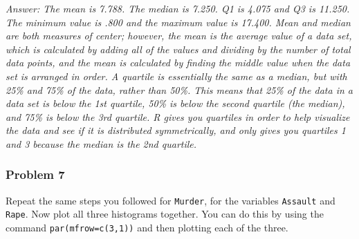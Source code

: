 \documentclass[
]{article}
\newenvironment{Shaded}{\begin{snugshade}}{\end{snugshade}}
\newcommand{\AttributeTok}[1]{\textcolor[rgb]{0.77,0.63,0.00}{#1}}
\newcommand{\FunctionTok}[1]{\textcolor[rgb]{0.00,0.00,0.00}{#1}}
\newcommand{\NormalTok}[1]{#1}
\newcommand{\SpecialCharTok}[1]{\textcolor[rgb]{0.00,0.00,0.00}{#1}}
\newcommand{\StringTok}[1]{\textcolor[rgb]{0.31,0.60,0.02}{#1}}
\begin{document}
\emph{Answer: The mean is 7.788. The median is 7.250. Q1 is 4.075 and Q3
is 11.250. The minimum value is .800 and the maximum value is 17.400.
Mean and median are both measures of center; however, the mean is the
average value of a data set, which is calculated by adding all of the
values and dividing by the number of total data points, and the mean is
calculated by finding the middle value when the data set is arranged in
order. A quartile is essentially the same as a median, but with 25\% and
75\% of the data, rather than 50\%. This means that 25\% of the data in
a data set is below the 1st quartile, 50\% is below the second quartile
(the median), and 75\% is below the 3rd quartile. R gives you quartiles
in order to help visualize the data and see if it is distributed
symmetrically, and only gives you quartiles 1 and 3 because the median
is the 2nd quartile.}

\hypertarget{problem-7}{%
\subsubsection{Problem 7}\label{problem-7}}

Repeat the same steps you followed for \texttt{Murder}, for the
variables \texttt{Assault} and \texttt{Rape}. Now plot all three
histograms together. You can do this by using the command
\texttt{par(mfrow=c(3,1))} and then plotting each of the three.

\begin{Shaded}
\end{Shaded}
\end{document}
